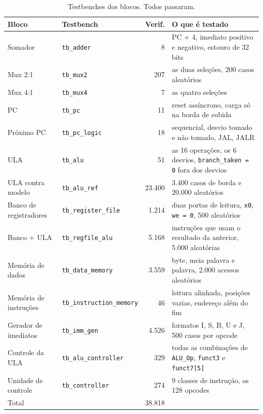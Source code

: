 \documentclass[11pt,a4paper]{article}
\begin{document}
\begin{table}[H]
  \centering
  \small
  \caption{Testbenches dos blocos. Todos passaram.}
  \begin{tabularx}{\textwidth}{llrY}
    \toprule
    Bloco & Testbench & Verif. & O que é testado \\
    \midrule
    Somador & \texttt{tb\_adder} & 8 & PC + 4, imediato positivo e negativo, estouro de 32 bits \\
    Mux 2:1 & \texttt{tb\_mux2} & 207 & as duas seleções, 200 casos aleatórios \\
    Mux 4:1 & \texttt{tb\_mux4} & 7 & as quatro seleções \\
    PC & \texttt{tb\_pc} & 11 & reset assíncrono, carga só na borda de subida \\
    Próximo PC & \texttt{tb\_pc\_logic} & 18 & sequencial, desvio tomado e não tomado, JAL, JALR \\
    ULA & \texttt{tb\_alu} & 51 & as 16 operações, os 6 desvios, \texttt{branch\_taken = 0} fora dos desvios \\
    ULA contra modelo & \texttt{tb\_alu\_ref} & 23.400 & 3.400 casos de borda e 20.000 aleatórios \\
    Banco de registradores & \texttt{tb\_register\_file} & 1.214 & duas portas de leitura, \texttt{x0}, \texttt{we = 0}, 500 aleatórios \\
    Banco + ULA & \texttt{tb\_regfile\_alu} & 5.168 & instruções que usam o resultado da anterior, 5.000 aleatórias \\
    Memória de dados & \texttt{tb\_data\_memory} & 3.559 & byte, meia palavra e palavra, 2.000 acessos aleatórios \\
    Memória de instruções & \texttt{tb\_instruction\_memory} & 46 & leitura alinhada, posições vazias, endereço além do fim \\
    Gerador de imediatos & \texttt{tb\_imm\_gen} & 4.526 & formatos I, S, B, U e J, 500 casos por opcode \\
    Controle da ULA & \texttt{tb\_alu\_controller} & 329 & todas as combinações de \texttt{ALU\_Op}, \texttt{funct3} e \texttt{funct7[5]} \\
    Unidade de controle & \texttt{tb\_controller} & 274 & 9 classes de instrução, os 128 opcodes \\
    \midrule
    Total & & 38.818 & \\
    \bottomrule
  \end{tabularx}
\end{table}
\end{document}
